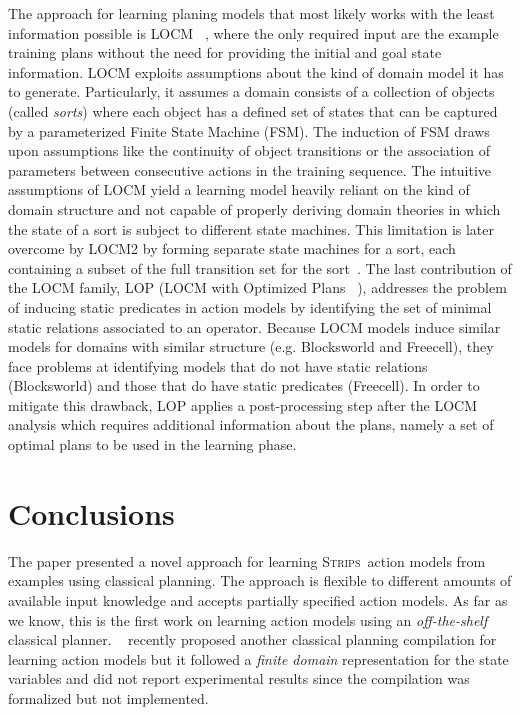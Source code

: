 \documentclass[letterpaper]{article} %
\newcommand{\strips}{\textsc{Strips}}     %
\begin{document}
The approach for learning planing models that most likely works with the least information possible is {\sf LOCM} ~\cite{cresswell2013acquiring}, where the only required input are the example training plans without the need for providing the initial and goal state information. {\sf LOCM} exploits assumptions about the kind of domain model it has to generate. Particularly, it assumes a domain consists of a collection of objects (called \emph{sorts}) where each object has a defined set of states that can be captured by a parameterized Finite State Machine (FSM). The induction of FSM draws upon assumptions like the continuity of object transitions or the association of parameters between consecutive actions in the training sequence. The intuitive assumptions of {\sf LOCM} yield a learning model heavily reliant on the kind of domain structure and not capable of properly deriving domain theories in which the state of a sort is subject to different state machines. This limitation is later overcome by {\sf LOCM2} by forming separate state machines for a sort, each containing a subset of the full transition set for the sort~\cite{cresswell2011generalised}. The last contribution of the {\sf LOCM} family, {\sf LOP} ({\sf LOCM} with Optimized Plans ~\cite{GregoryC16}), addresses the problem of inducing static predicates in action models by identifying the set of minimal static relations associated to an operator. Because {\sf LOCM} models induce similar models for domains with similar structure (e.g. Blocksworld and Freecell), they face problems at identifying models that do not have static relations (Blocksworld) and those that do have static predicates (Freecell). In order to mitigate this drawback, {\sf LOP} applies a post-processing step after the {\sf LOCM} analysis which requires additional information about the plans, namely a set of optimal plans to be used in the learning phase.


\section{Conclusions}
The paper presented a novel approach for learning \strips\ action models from examples using classical planning. The approach is flexible to different amounts of available input knowledge and accepts partially specified action models. As far as we know, this is the first work on learning action models using an {\em off-the-shelf} classical planner. ~\citeauthor{stern2017efficient} recently proposed another classical planning compilation for learning action models but it followed a {\em finite domain} representation for the state variables and did not report experimental results since the compilation was formalized but not implemented.  
\end{document}
